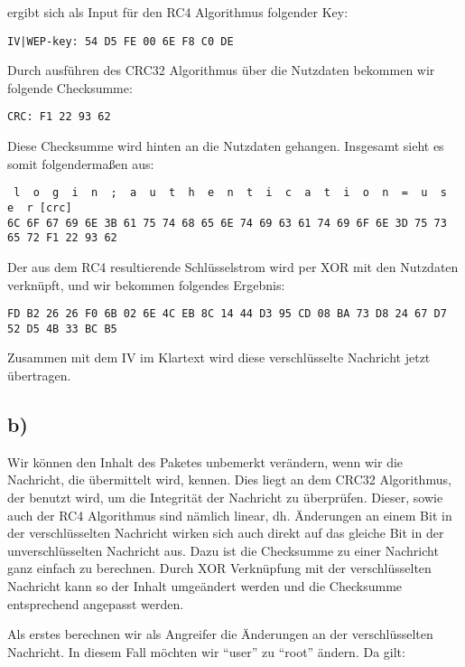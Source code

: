 \documentclass[10pt,a4paper]{article}
\begin{document}
ergibt sich als Input für den RC4 Algorithmus folgender Key:

\begin{verbatim}
IV|WEP-key: 54 D5 FE 00 6E F8 C0 DE
\end{verbatim}

Durch ausführen des CRC32 Algorithmus über die Nutzdaten bekommen wir folgende Checksumme:

\begin{verbatim}
CRC: F1 22 93 62
\end{verbatim}

Diese Checksumme wird hinten an die Nutzdaten gehangen. Insgesamt sieht es somit folgendermaßen aus:

\begin{verbatim}
 l  o  g  i  n  ;  a  u  t  h  e  n  t  i  c  a  t  i  o  n  =  u  s  e  r [crc]
6C 6F 67 69 6E 3B 61 75 74 68 65 6E 74 69 63 61 74 69 6F 6E 3D 75 73 65 72 F1 22 93 62 
\end{verbatim}

Der aus dem RC4 resultierende Schlüsselstrom wird per XOR mit den Nutzdaten verknüpft, und wir bekommen folgendes Ergebnis:

\begin{verbatim}
FD B2 26 26 F0 6B 02 6E 4C EB 8C 14 44 D3 95 CD 08 BA 73 D8 24 67 D7 52 D5 4B 33 BC B5 
\end{verbatim}

Zusammen mit dem IV im Klartext wird diese verschlüsselte Nachricht jetzt übertragen.

\subsection*{b)}

Wir können den Inhalt des Paketes unbemerkt verändern, wenn wir die Nachricht, die übermittelt wird, kennen. Dies liegt an dem CRC32 Algorithmus, der benutzt wird, um die Integrität der Nachricht zu überprüfen. Dieser, sowie auch der RC4 Algorithmus sind nämlich linear, dh. Änderungen an einem Bit in der verschlüsselten Nachricht wirken sich auch direkt auf das gleiche Bit in der unverschlüsselten Nachricht aus. Dazu ist die Checksumme zu einer Nachricht ganz einfach zu berechnen. Durch XOR Verknüpfung mit der verschlüsselten Nachricht kann so der Inhalt umgeändert werden und die Checksumme entsprechend angepasst werden.

Als erstes berechnen wir als Angreifer die Änderungen an der verschlüsselten Nachricht. In diesem Fall möchten wir "`user"' zu "`root"' ändern. Da gilt:
\end{document}
